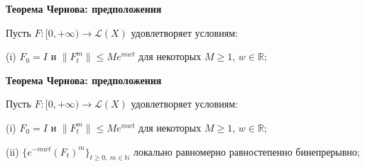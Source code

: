 \documentclass[11pt]{article}
\newcommand{\R}{\mathbb{R}}
\newcommand{\N}{\mathbb{N}}
\begin{document}
\newpage

\begin{center}
{\color{notaeYELLOW}\bfseries\fontsize{44}{52}\selectfont Теорема Чернова: предположения}
\end{center}
\vspace*{\fill}
\begin{center}
\fontsize{36}{43}\selectfont
\parbox{\linewidth}{\centering\noindent Пусть $F:[0,+\infty)\to\mathcal{L}(X)$ удовлетворяет условиям:
\par}\vspace{0.4in}
\parbox{\linewidth}{\centering\noindent (i) $F_0=I$ и $\|F_t^m\|\le Me^{mwt}$ для некоторых $M\ge1$, $w\in\R$;
\par}\vspace{0.4in}
\end{center}
\vspace*{\fill}

\newpage

\begin{center}
{\color{notaeYELLOW}\bfseries\fontsize{44}{52}\selectfont Теорема Чернова: предположения}
\end{center}
\vspace*{\fill}
\begin{center}
\fontsize{36}{43}\selectfont
\parbox{\linewidth}{\centering\noindent Пусть $F:[0,+\infty)\to\mathcal{L}(X)$ удовлетворяет условиям:
\par}\vspace{0.4in}
\parbox{\linewidth}{\centering\noindent (i) $F_0=I$ и $\|F_t^m\|\le Me^{mwt}$ для некоторых $M\ge1$, $w\in\R$;
\par}\vspace{0.4in}
\parbox{\linewidth}{\centering\noindent (ii) $\{e^{-mwt}(F_t)^m\}_{t\ge0,\ m\in\N}$ локально равномерно равностепенно бинепрерывно;
\par}\vspace{0.4in}
\end{center}
\vspace*{\fill}

\newpage
\end{document}
